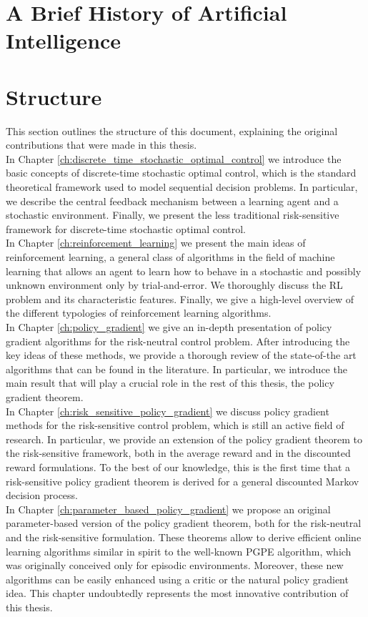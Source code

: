 \section{A Brief History of Artificial Intelligence}

\section{Structure}
This section outlines the structure of this document, explaining the original contributions that were made in this thesis.\\
In Chapter \ref{ch:discrete_time_stochastic_optimal_control} we introduce the basic concepts of discrete-time stochastic optimal control, which is the standard theoretical framework used to model sequential decision problems. In particular, we describe the central feedback mechanism between a learning agent and a stochastic environment. Finally, we present the less traditional risk-sensitive framework for discrete-time stochastic optimal control.\\
In Chapter \ref{ch:reinforcement_learning} we present the main ideas of reinforcement learning, a general class of algorithms in the field of machine learning that allows an agent to learn how to behave in a stochastic and possibly unknown environment only by trial-and-error. We thoroughly discuss the RL problem and its characteristic features. Finally, we give a high-level overview of the different typologies of reinforcement learning algorithms.\\ 
In Chapter \ref{ch:policy_gradient} we give an in-depth presentation of policy gradient algorithms for the risk-neutral control problem. After introducing the key ideas of these methods, we provide a thorough review of the state-of-the art algorithms that can be found in the literature. In particular, we introduce the main result that will play a crucial role in the rest of this thesis, the policy gradient theorem.\\
In Chapter \ref{ch:risk_sensitive_policy_gradient} we discuss policy gradient methods for the risk-sensitive control problem, which is still an active field of research. In particular, we provide an extension of the policy gradient theorem to the risk-sensitive framework, both in the average reward and in the discounted reward formulations. To the best of our knowledge, this is the first time that a risk-sensitive policy gradient theorem is derived for a general discounted Markov decision process.\\
In Chapter \ref{ch:parameter_based_policy_gradient} we propose an original parameter-based version of the policy gradient theorem, both for the risk-neutral and the risk-sensitive formulation. These theorems allow to derive efficient online learning algorithms similar in spirit to the well-known PGPE algorithm, which was originally conceived only for episodic environments. Moreover, these new algorithms can be easily enhanced using a critic or the natural policy gradient idea. This chapter undoubtedly represents the most innovative contribution of this thesis.\\ 

